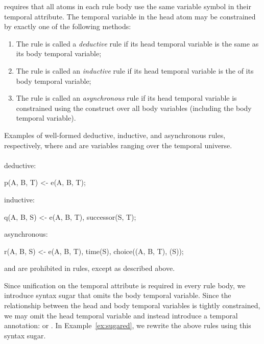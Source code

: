 \vspace{1em}
\lang requires that all atoms in each rule body use the same variable symbol in their temporal attribute.  The temporal variable in the head atom may be constrained by exactly one of the following methods:

\begin{enumerate}
\item The rule is called a {\em deductive} rule if its head temporal variable is the same as its body temporal variable;
\item The rule is called an {\em inductive} rule if its head temporal variable is the  of its body temporal variable;
\item The rule is called an {\em asynchronous} rule if its head temporal variable is constrained using the  construct over all body variables (including the body temporal variable).
\end{enumerate}

\begin{example}
\label{ex:nonsugared}
Examples of well-formed deductive, inductive, and asynchronous rules, respectively, where  and  are variables ranging over the temporal universe.
\\\\
deductive:
\begin{Dedalus}
p(A, B, T) <- e(A, B, T);
\end{Dedalus}
inductive:
\begin{Dedalus}
q(A, B, S) <- e(A, B, T), successor(S, T);
\end{Dedalus}
asynchronous:
\begin{Dedalus}
r(A, B, S) <- e(A, B, T), time(S),
              choice((A, B, T), (S));
\end{Dedalus}
\end{example}

 and  are prohibited in rules, except as described above.

Since unification on the temporal attribute is required in every rule body, we introduce syntax sugar that omits the body temporal variable.  Since the relationship between the head and body temporal variables is tightly constrained, we may omit the head temporal variable and instead introduce a temporal annotation:  or .  In Example~\ref{ex:sugared}, we rewrite the above rules using this syntax sugar.

